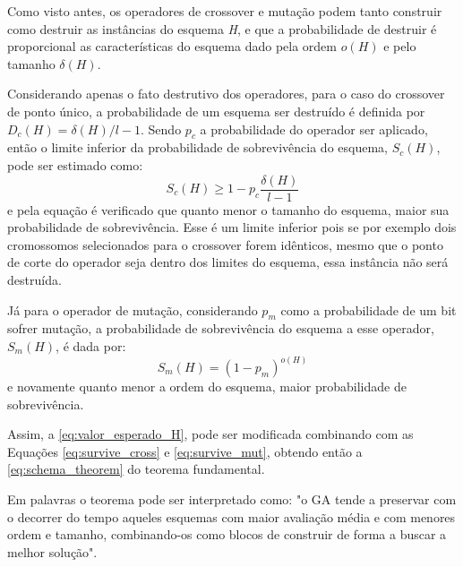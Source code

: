 Como visto antes, os operadores de crossover e mutação podem tanto construir como destruir as instâncias do esquema \textit{H}, e que a probabilidade de destruir é proporcional as características do esquema dado pela ordem \(o(H)\) e pelo tamanho \(\delta(H)\). 

Considerando apenas o fato destrutivo dos operadores, para o caso do crossover de ponto único, a probabilidade de um esquema ser destruído é definida por \(D_c(H) = {\delta(H)}/{l - 1}\). Sendo \(p_c\) a probabilidade do operador ser aplicado, então o limite inferior da probabilidade de sobrevivência do esquema, \(S_c(H)\), pode ser estimado como:
\begin{equation}
S_c(H) \ge 1 - p_c \frac{\delta(H)}{l - 1} %
\label{eq:survive_cross}
\end{equation}
e pela equação é verificado que quanto menor o tamanho do esquema, maior sua probabilidade de sobrevivência. Esse é um limite inferior pois se por exemplo dois cromossomos selecionados para o crossover forem idênticos, mesmo que o ponto de corte do operador seja dentro dos limites do esquema, essa instância não será destruída.

Já para o operador de mutação, considerando \(p_m\) como a probabilidade de um bit sofrer mutação, a probabilidade de sobrevivência do esquema a esse operador, \(S_m(H)\), é dada por:
\begin{equation}
S_m(H) = (1 - p_m)^{o(H)}
\label{eq:survive_mut}
\end{equation}
e novamente quanto menor a ordem do esquema, maior probabilidade de sobrevivência.

Assim, a \autoref{eq:valor_esperado_H}, pode ser modificada combinando com as Equações \ref{eq:survive_cross} e \ref{eq:survive_mut}, obtendo então a \autoref{eq:schema_theorem} do teorema fundamental.

Em palavras o teorema pode ser interpretado como: "o GA tende a preservar com o decorrer do tempo aqueles esquemas com maior avaliação média e com menores ordem e tamanho, combinando-os como blocos de construir de forma a buscar a melhor solução". \cite{Linden2008} 
 
